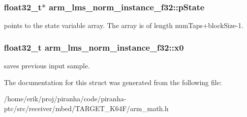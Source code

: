 \subsubsection[{\texorpdfstring{p\+State}{pState}}]{\setlength{\rightskip}{0pt plus 5cm}float32\+\_\+t$\ast$ arm\+\_\+lms\+\_\+norm\+\_\+instance\+\_\+f32\+::p\+State}\hypertarget{structarm__lms__norm__instance__f32_a0bc03338687002ed5f2e4a363eb095ec}{}\label{structarm__lms__norm__instance__f32_a0bc03338687002ed5f2e4a363eb095ec}
points to the state variable array. The array is of length num\+Taps+block\+Size-\/1. 
\subsubsection[{\texorpdfstring{x0}{x0}}]{\setlength{\rightskip}{0pt plus 5cm}float32\+\_\+t arm\+\_\+lms\+\_\+norm\+\_\+instance\+\_\+f32\+::x0}\hypertarget{structarm__lms__norm__instance__f32_aec958fe89b164a30f38bcca9f5d96218}{}\label{structarm__lms__norm__instance__f32_aec958fe89b164a30f38bcca9f5d96218}
saves previous input sample. 

The documentation for this struct was generated from the following file\+:\begin{DoxyCompactItemize}
\item 
/home/erik/proj/piranha/code/piranha-\/ptc/src/receiver/mbed/\+T\+A\+R\+G\+E\+T\+\_\+\+K64\+F/arm\+\_\+math.\+h\end{DoxyCompactItemize}
